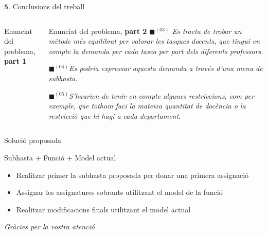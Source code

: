 \documentclass[twocolumn]{beamer}
\begin{document}
\begin{frame}{$\mathbf{5.}$ Conclusions del treball}
\begin{columns}[t]
	\begin{column}{.5\textwidth}
		\begin{block}{Enunciat del problema, \textbf{part 1}}
			
		\end{block}
	\end{column}
	\begin{column}{.5\textwidth}
		\begin{block}{Enunciat del problema, \textbf{part 2}}
			\small	
			\textit{{\color{green!60}$\blacksquare$}$^{(03)}$ {\color{black!80}Es tracta de trobar un mètode més equilibrat per valorar les tasques docents, que tingui en compte la demanda per cada tasca per part dels diferents professors.}}
			
			\textit{{\color{purple!60}$\blacksquare$}$^{(04)}$Es podria expressar aquesta demanda a través d'una mena de subhasta.}
			
			\textit{{\color{violet!60}$\blacksquare$}$^{(05)}${\color{black!80}S'haurien de tenir en compte algunes restriccions, com per exemple, que tothom faci la mateixa quantitat de docència o la restricció que hi hagi a cada departament.}}
		\end{block}
	\end{column}
\end{columns}
\end{frame}

\begin{frame}{Solució proposada}
\begin{block}{Subhasta + Funció + Model actual}
	\begin{itemize}
		\item Realitzar primer la subhasta proposada per donar una primera assignació
		\item Assignar les assignatures sobrants utilitzant el model de la funció
		\item Realitzar modificacions finals utilitzant el model actual
	\end{itemize}
\end{block}
\end{frame}

\begin{frame}
\textit{\color{redviolet} \Huge Gràcies per la vostra atenció}
\end{frame}
\end{document}
